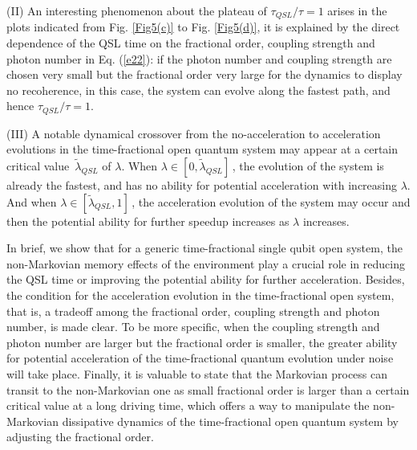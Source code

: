 \documentclass[
showpacs,  %
showkeys,  %
aps,       %
amsthm,    %
amsmath,   %
amsfonts,  %
amssymb    %
]{revtex4-1}          %
\begin{document}
(II) An interesting phenomenon about the plateau of ${\tau _{QSL}}/{\tau}=1$ arises in the plots indicated from Fig. \ref{Fig5(c)} to Fig. \ref{Fig5(d)}, it is explained by the direct dependence of the QSL time on the fractional order, coupling strength and photon number in Eq. (\ref{e22}): if the photon number and coupling strength are chosen very small but the fractional order very large for the dynamics to display no recoherence, in this case, the system can evolve along the fastest path, and hence ${\tau _{QSL}}/{\tau}=1$.

(III) A notable dynamical crossover from the no-acceleration to acceleration evolutions in the time-fractional open quantum system may appear at a certain critical value $\,{{\tilde \lambda}_{QSL}}$ of $\lambda$. When $\lambda\in\left[ {0,{{\tilde\lambda}_{QSL}}}\right]\,$, the evolution of the system is already the fastest, and has no ability for potential acceleration with increasing $\lambda$. And when $\lambda\in\left[{{{\tilde\lambda}_{QSL}},1}\right]\,$, the acceleration evolution of the system may occur and then the potential ability for further speedup increases as $\lambda$ increases.

In brief, we show that for a generic time-fractional single qubit open system, the non-Markovian memory effects of the environment play a crucial role in reducing the QSL time or improving the potential ability for further acceleration. Besides, the condition for the acceleration evolution in the time-fractional open system, that is, a tradeoff among the fractional order, coupling strength and photon number, is made clear. To be more specific, when the coupling strength and photon number are larger but the fractional order is smaller, the greater ability for potential acceleration of the time-fractional quantum evolution under noise will take place. Finally, it is valuable to state that the Markovian process can transit to the non-Markovian one as small fractional order is larger than a certain critical value at a long driving time, which offers a way to manipulate the non-Markovian dissipative dynamics of the time-fractional open quantum system by adjusting the fractional order.
\end{document}

